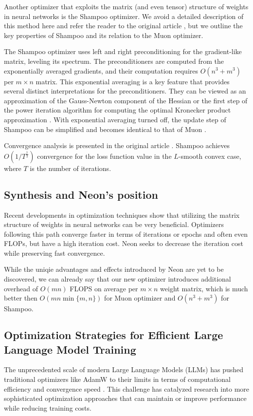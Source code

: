 \documentclass[]{scrartcl}
\begin{document}
Another optimizer that exploits the matrix (and even tensor) structure of weights in neural networks is the Shampoo optimizer. We avoid a detailed description of this method here and refer the reader to the original article \cite{gupta2018shampoopreconditionedstochastictensor}, but we outline the key properties of Shampoo and its relation to the Muon optimizer.

The Shampoo optimizer uses left and right preconditioning for the gradient-like matrix, leveling its spectrum. The preconditioners are computed from the exponentially averaged gradients, and their computation requires $O(n^3 + m^3)$ per $m \times n$ matrix. This exponential averaging is a key feature that provides several distinct interpretations for the preconditioners. They can be viewed as an approximation of the Gauss-Newton component of the Hessian or the first step of the power iteration algorithm for computing the optimal Kronecker product approximation \cite{morwani2025a}. With exponential averaging turned off, the update step of Shampoo can be simplified and becomes identical to that of Muon \cite{jordan2024muon}.

Convergence analysis is presented in the original article \cite{gupta2018shampoopreconditionedstochastictensor}. Shampoo achieves $O(1/T^{\frac{1}{2}})$ convergence for the loss function value in the $L$-smooth convex case, where $T$ is the number of iterations.

\subsection{Synthesis and Neon's position}

Recent developments in optimization techniques show that utilizing the matrix structure of weights in neural networks can be very beneficial. Optimizers following this path converge faster in terms of iterations or epochs and often even FLOPs, but have a high iteration cost. Neon seeks to decrease the iteration cost while preserving fast convergence.

While the uniqie advantages and effects introduced by Neon are yet to be discovered, we can already say that our new optimizer introduces additional overhead of $O(mn)$ FLOPS on average per $m \times n$ weight matrix, which is much better then $O(m n \min\{m, n\})$ for Muon optimizer and $O(n^3 + m^3)$ for Shampoo. 

\subsection{Optimization Strategies for Efficient Large Language Model Training}
The unprecedented scale of modern Large Language Models (LLMs) has pushed traditional optimizers like AdamW \cite{Loshchilov2017FixingWD} to their limits in terms of computational efficiency and convergence speed \cite{liu2025muon,chen2025cosmoshybridadaptive}. This challenge has catalyzed research into more sophisticated optimization approaches that can maintain or improve performance while reducing training costs.
\end{document}
